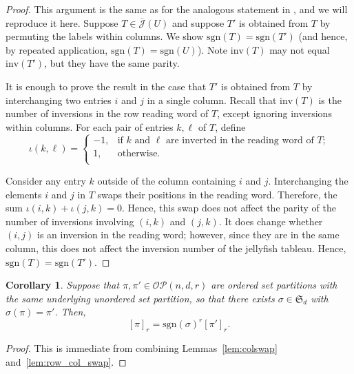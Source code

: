 \documentclass[10pt]{amsart}
\theoremstyle{definition}
\theoremstyle{plain}
\theoremstyle{plain}
\theoremstyle{definition}
\theoremstyle{remark}
\theoremstyle{plain}
\theoremstyle{plain}
\newtheorem{corollary}[cdrthm]{Corollary}
\theoremstyle{plain}
\numberwithin{equation}{section}
\newcommand{\rstabgen}{\overline{\mathcal{J}}}
\newcommand{\inv}{\mathrm{inv}}
\newcommand{\sgn}{\mathrm{sgn}}
\newcommand{\ordsetpart}{\mathcal{OP}}
\begin{document}
\begin{proof} 
This argument is the same as for the analogous statement in \cite[Lemma~3.9]{Patrias.Pechenik.Striker}, and we will reproduce it here.
Suppose $T\in \rstabgen(U)$ and suppose $T'$ is obtained from $T$ by permuting the labels within columns.
We show $\sgn(T)=\sgn(T')$ (and hence, by repeated application, $\sgn(T) = \sgn(U)$). Note $\inv(T)$ may not equal $\inv(T')$, but they have the same parity.

It is enough to prove the result in the case that $T'$ is obtained from $T$ by interchanging two entries $i$ and $j$ in a single column.
Recall that $\inv(T)$ is the number of inversions in the row reading word of $T$, except ignoring inversions within columns. For each pair of entries $k,\ell$ of $T$, define
\[
\iota(k,\ell) = \begin{cases}
-1, & \text{if $k$ and $\ell$ are inverted in the reading word of $T$;} \\
1, & \text{otherwise.}\\
\end{cases}
\]

Consider any entry $k$ outside of the column containing $i$ and $j$.
Interchanging the elements $i$ and $j$ in $T$ swaps their
positions in the reading word. Therefore, the sum $\iota(i,k) + \iota(j,k) = 0$. Hence, this swap does not affect the parity of the number of inversions involving $(i, k)$ and $(j, k)$.
It does change whether $(i, j)$ is an inversion in the reading word; however, since they are in the same column, this does not affect the inversion number of the jellyfish tableau. Hence, $\sgn(T) = \sgn(T')$.
\end{proof}

\begin{corollary}
    Suppose that $\pi, \pi' \in \ordsetpart(n,d,r)$ are ordered set partitions with the same underlying unordered set partition, so that there exists $\sigma\in\mathfrak{S}_d$ with $\sigma(\pi)=\pi'$. Then, 
    \[
    [\pi]_r = \sgn(\sigma)^r [\pi']_r.
    \]
\end{corollary}
\begin{proof}
    This is immediate from combining Lemmas~\ref{lem:colswap} and~\ref{lem:row_col_swap}.
\end{proof}
\end{document}
